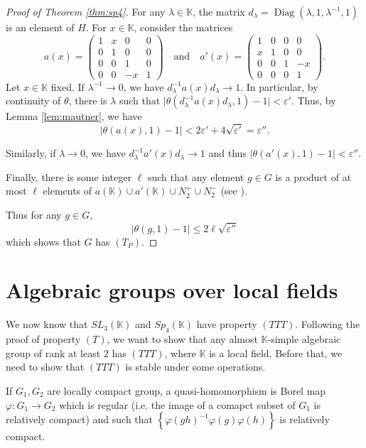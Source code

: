 \documentclass{article}
\theoremstyle{definition}
\theoremstyle{remark}
\numberwithin{equation}{section}
\newcommand{\K}{\mathbb{K}}
\DeclareMathOperator{\Diag}{Diag}
\begin{document}
\begin{proof}[Proof of Theorem \ref{thm:sp4}]
For any $\lambda\in \K$, the matrix $d_\lambda=\Diag\left(\lambda,1,\lambda^{-1},1\right)$ is an element of $H$. For $x\in \K$, consider the matrices $$a(x)=\begin{pmatrix}
    1 & x & 0 & 0\\
    0 & 1 & 0 & 0\\
    0 & 0 & 1 & 0\\
    0 & 0 & -x & 1
\end{pmatrix}\quad \mathrm{ and }\quad a'(x)=\begin{pmatrix}
    1 & 0 & 0 & 0\\
    x & 1 & 0 & 0\\
    0 & 0 & 1 & -x\\
    0 & 0 & 0 & 1
\end{pmatrix}.$$
Let $x\in \K$ fixed. If $\lambda^{-1}\to 0$, we have $d_\lambda^{-1} a(x)d_\lambda\to 1$. In particular, by continuity of $\theta$, there is $\lambda$ such that $\vert \theta(d_\lambda^{-1} a(x)d_\lambda,1)-1\vert < \varepsilon'$. Thus, by Lemma \ref{lem:mautner}, we have $$\vert \theta(a(x),1)-1\vert < 2\varepsilon'+4\sqrt{\varepsilon'}=\varepsilon''.$$

Similarly, if $\lambda\to 0$, we have $d_\lambda^{-1} a'(x)d_\lambda\to 1$ and thus $\vert \theta(a'(x),1)-1\vert < \varepsilon''$.\medskip

Finally, there is some integer $\ell$ such that any element $g\in G$ is a product of at most $\ell$ elements of $a(\K)\cup a'(\K)\cup N_2^+\cup N_2^-$ (see \cite{neuhauser}).

Thus for any $g\in G$, \begin{equation*}\vert \theta(g,1)-1\vert\leq 2\ell \sqrt{\varepsilon''}\end{equation*}which shows that $G$ has $(T_P)$.
\end{proof}


\section{Algebraic groups over local fields}
We now know that $SL_3(\mathbb{K})$ and $Sp_4(\mathbb{K})$ have property $(TTT)$. Following the proof of property $(T)$, we want to show that any   almost $\K$-simple algebraic group of rank at least $2$ has $(TTT)$, where $\K$ is a local field. Before that, we need to show that $(TTT)$ is stable under some operations.\medskip

If $G_1,G_2$ are locally compact group, a quasi-homomorphism is Borel map $\varphi:G_1\to G_2$ which is regular (i.e. the image of a comapct subset of $G_1$ is relatively compact) and such that $\left\{\varphi(gh)^{-1}\varphi(g)\varphi(h)\right\}$ is relatively compact. 
\end{document}
